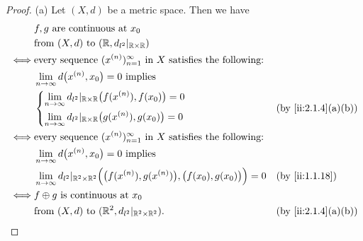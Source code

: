 \begin{proof}{(a)}
  Let \((X, d)\) be a metric space.
  Then we have
  \begin{align*}
         & f, g \text{ are continuous at } x_0                                                                                                          \\
         & \text{from } (X, d) \text{ to } (\R, d_{l^2}|_{\R \times \R})                                                                                \\
    \iff & \text{every sequence } (x^{(n)})_{n = 1}^\infty \text{ in } X \text{ satisfies the following:}                                               \\
         & \lim_{n \to \infty} d\big(x^{(n)}, x_0\big) = 0 \text{ implies }                                                                             \\
         & \begin{dcases}
             \lim_{n \to \infty} d_{l^2}|_{\R \times \R}\big(f(x^{(n)}), f(x_0)\big) = 0 \\
             \lim_{n \to \infty} d_{l^2}|_{\R \times \R}\big(g(x^{(n)}), g(x_0)\big) = 0
           \end{dcases}                                          &  & \by{ii:2.1.4}[a,b]                                                                  \\
    \iff & \text{every sequence } (x^{(n)})_{n = 1}^\infty \text{ in } X \text{ satisfies the following:}                                               \\
         & \lim_{n \to \infty} d\big(x^{(n)}, x_0\big) = 0 \text{ implies }                                                                             \\
         & \lim_{n \to \infty} d_{l^2}|_{\R^2 \times \R^2}\Big(\big(f(x^{(n)}), g(x^{(n)})\big), \big(f(x_0), g(x_0)\big)\Big) = 0 &  & \by{ii:1.1.18}     \\
    \iff & f \oplus g \text{ is continuous at } x_0                                                                                                     \\
         & \text{from } (X, d) \text{ to } (\R^2, d_{l^2}|_{\R^2 \times \R^2}).                                                    &  & \by{ii:2.1.4}[a,b]
  \end{align*}
\end{proof}

